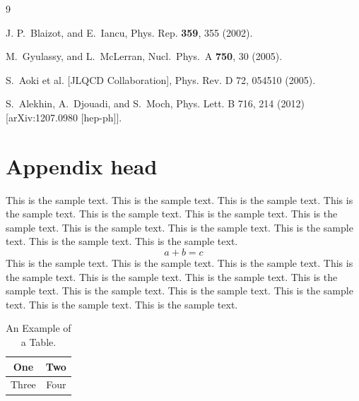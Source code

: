 \documentclass[preprint,pteplogo]{ptephy_v2}%
\begin{document}
\begin{thebibliography}{9}

J. P.~Blaizot, and E.~Iancu, Phys. Rep. {\bf 359}, 355 (2002).

M.~Gyulassy, and L.~McLerran, Nucl.\ Phys.\  A {\bf 750}, 30 (2005). \\ 

S.~Aoki et al. [JLQCD Collaboration], Phys. Rev. D 72, 054510 (2005). \\

S.~Alekhin, A.~Djouadi, and S.~Moch, Phys. Lett. B 716, 214 (2012) [arXiv:1207.0980 [hep-ph]]. 

\end{thebibliography}

\appendix

\section{Appendix head}

This is the sample text. This is the sample text. This is the sample text. This is the sample text.
This is the sample text. This is the sample text. This is the sample text. This is the sample text.
This is the sample text. This is the sample text. This is the sample text. This is the sample text.
\begin{equation}
a + b = c
\end{equation}
This is the sample text. This is the sample text. This is the sample text. This is the sample text.
This is the sample text. This is the sample text. This is the sample text. This is the sample text.
This is the sample text. This is the sample text. This is the sample text. This is the sample text.

\begin{table}[!h]
\caption{An Example of a Table.}%
\label{table_example_b}
\centering
\begin{tabular}{|c||c|}%
\hline
One & Two\\ %
\hline
Three & Four\\%
\hline
\end{tabular}
\end{table}%
\end{document}
